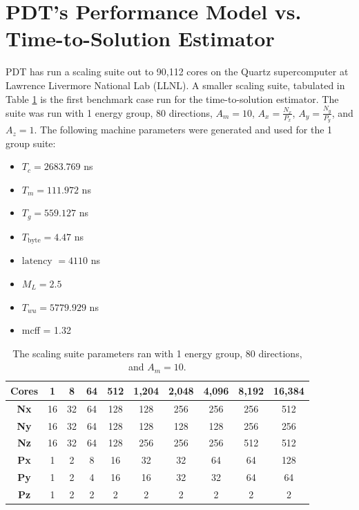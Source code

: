\section{PDT's Performance Model vs. Time-to-Solution Estimator}

PDT has run a scaling suite out to 90,112 cores on the Quartz supercomputer \cite{quartz} at Lawrence Livermore National Lab (LLNL).
A smaller scaling suite, tabulated in Table \ref{scaling_suite} is the first benchmark case run for the time-to-solution estimator.
The suite was run with 1 energy group, 80 directions, $A_m = 10$, $A_x=\frac{N_x}{P_x}$, $A_y=\frac{N_y}{P_y}$, and $A_z = 1$.
The following machine parameters were generated and used for the 1 group suite:
\begin{itemize}
  \item $T_c = 2683.769$ ns
  \item $T_m = 111.972$ ns
  \item $T_g = 559.127$ ns
  \item $T_\text{byte} = 4.47$ ns
  \item $\text{latency }= 4110$ ns
  \item $M_L = 2.5$
  \item $T_{wu} = 5779.929$ ns
  \item mcff = 1.32
\end{itemize}

\begin{table}[H]
  \centering
  \begin{tabular}{c|c|c|c|c|c|c|c|c|c}
    \textbf{Cores} & 1 & 8 & 64 & 512 & 1,204 & 2,048 & 4,096 & 8,192 & 16,384 \\ \hline
    \textbf{Nx} & 16 & 32 & 64 & 128 & 128 & 256 & 256 & 256 & 512 \\ \hline
    \textbf{Ny} & 16 & 32 & 64 & 128 & 128 & 128 & 128 & 256 & 256 \\ \hline
    \textbf{Nz} & 16 & 32 & 64 & 128 & 256 & 256 & 256 & 512 & 512 \\ \hline
    \textbf{Px} & 1  & 2  & 8  & 16  & 32  & 32  & 64  & 64  & 128 \\ \hline
    \textbf{Py} & 1  & 2  & 4  & 16  & 16  & 32  & 32  & 64  & 64  \\ \hline
    \textbf{Pz} & 1  & 2  & 2  & 2   & 2   & 2   & 2   & 2   & 2   \\
  \end{tabular}
  \caption{The scaling suite parameters ran with 1 energy group, 80 directions, and $A_m = 10$.}
  \label{scaling_suite}
\end{table}

